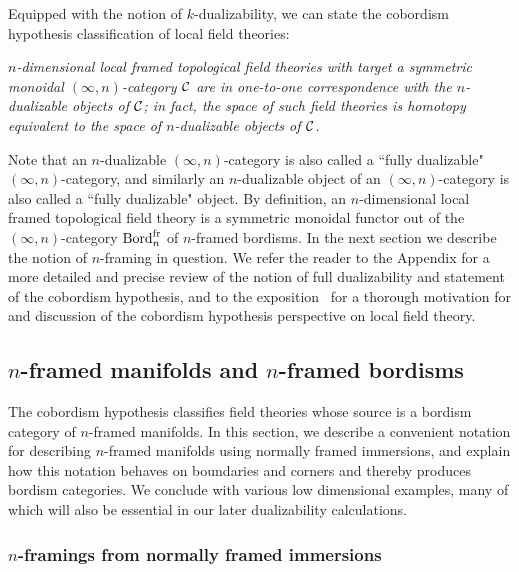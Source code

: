 \documentclass{amsart}
\begin{document}
Equipped with the notion of $k$-dualizability, we can state the cobordism hypothesis classification of local field theories: \vspace{7pt}

\setlength{\leftskip}{.75cm}

 \emph{$n$-dimensional local framed topological field theories with target a symmetric monoidal $(\infty,n)$-category $\mathcal C$ are in one-to-one correspondence with the $n$-dualizable objects of $\mathcal C$; in fact, the space of such field theories is homotopy equivalent to the space of $n$-dualizable objects of $\mathcal C$.} \vspace{7pt}

\setlength{\leftskip}{0cm}

\nid Note that an $n$-dualizable $(\infty,n)$-category is also called a ``fully dualizable" $(\infty,n)$-category, and similarly an $n$-dualizable object of an $(\infty,n)$-category is also called a ``fully dualizable" object.  By definition, an $n$-dimensional local framed topological field theory is a symmetric monoidal functor out of the $(\infty,n)$-category $\mathrm{Bord}^\mathrm{fr}_n$ of $n$-framed bordisms.  In the next section we describe the notion of $n$-framing in question.  We refer the reader to the Appendix for a more detailed and precise review of the notion of full dualizability and statement of the cobordism hypothesis, and to the exposition~\cite{MR2994995} for a thorough motivation for and discussion of the cobordism hypothesis perspective on local field theory.

\subsection{$n$-framed manifolds and $n$-framed bordisms} \label{sec:notation}


The cobordism hypothesis classifies field theories whose source is a bordism category of $n$-framed manifolds.  In this section, we describe a convenient notation for describing $n$-framed manifolds using normally framed immersions, and explain how this notation behaves on boundaries and corners and thereby produces bordism categories.  We conclude with various low dimensional examples, many of which will also be essential in our later dualizability calculations.

\subsubsection{$n$-framings from normally framed immersions}
\end{document}
